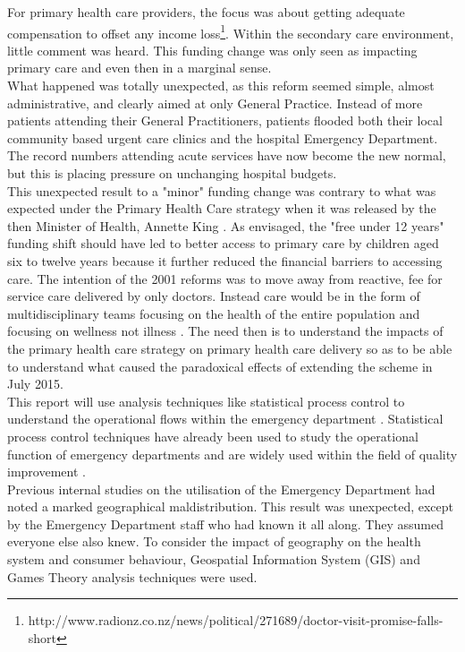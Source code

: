 \documentclass[11pt,a4paper]{article}
\begin{document}
For primary health care providers, the focus was about getting adequate compensation to offset any income loss\footnote{http://www.radionz.co.nz/news/political/271689/doctor-visit-promise-falls-short}. Within the secondary care environment, little comment was heard. This funding change was only seen as impacting primary care and even then in a marginal sense.\\


What happened was totally unexpected, as this reform seemed simple, almost administrative, and clearly aimed at only General Practice. Instead of more patients attending their General Practitioners, patients flooded both their local community based urgent care clinics and the hospital Emergency Department. The record numbers attending acute services have now become the new normal, but this is placing pressure on unchanging hospital budgets. \\


This unexpected result to a "minor" funding change was contrary to what was expected under the Primary Health Care strategy when it was released by the then Minister of Health, Annette King \citep{king2001primary}. As envisaged, the "free under 12 years" funding shift should have led to better access to primary care by children aged six to twelve years because it further reduced the financial barriers to accessing care. The intention of the 2001 reforms was to move away from reactive, fee for service care delivered by only doctors. Instead care would be in the form of multidisciplinary teams focusing on the health of the entire population and focusing on wellness not illness \citep{king2001primary}.  The need then is to understand the impacts of the primary health care strategy on primary health care delivery so as to be able to understand what caused the paradoxical effects of extending the scheme in July 2015.\\


This report will use analysis techniques like statistical process control to understand the operational flows within the emergency department \citep{rosemann2015six, cheng2015run, epprecht2015statistical}. Statistical process control techniques have already been used to study the operational function of emergency departments \citep{pimentel2015statistical} and are widely used within the field of quality improvement \citep{provost2011health}.\\


Previous internal studies on the utilisation of the Emergency Department had noted a marked geographical maldistribution. This result was unexpected, except by the Emergency Department staff who had known it all along. They assumed everyone else also knew. To consider the impact of geography on the health system and consumer behaviour, Geospatial Information System (GIS) and Games Theory analysis techniques were used.\\
\end{document}

